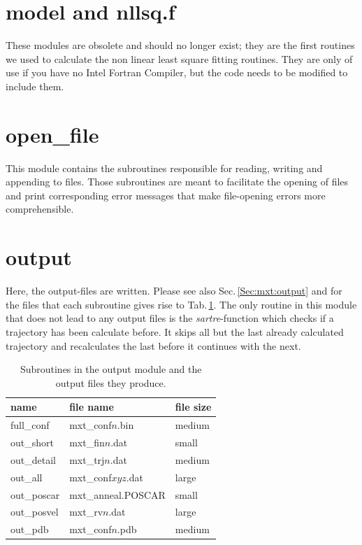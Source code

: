 \documentclass[twoside, 11pt, titlepage, captions=nooneline, a4paper, headsepline]{scrbook}%
\newcommand{\9}{\mathrm}
\newcommand{\0}{\,\mathrm}
\begin{document}
\section{model and nllsq.f}
These modules are obsolete and should no longer exist; they are the first routines we used to calculate the non linear least square fitting routines.
They are only of use if you have no Intel Fortran Compiler, but the code needs to be modified to include them.
\section{open\_file}
This module contains the subroutines responsible for reading, writing and appending to files. Those subroutines are meant to facilitate the opening of files and print corresponding error messages that make file-opening errors more comprehensible.

\section{output}
Here, the output-files are written. Please see also Sec.\,\ref{Sec:mxt:output} and for the files that each subroutine gives rise to Tab.\,\ref{Tab:Funct:output}. The only routine in this module that does not lead to any output files is the \textit{sartre}-function which checks if a trajectory has been calculate before. It skips all but the last already calculated trajectory and recalculates the last before it continues with the next.

\begin{table}[b!]
\centering
\caption{Subroutines in the output module and the output files they produce.}
\label{Tab:Funct:output}
\begin{tabular}{lll}
\hline\hline
name			&file name			& file size\\
\hline
full\_conf		&mxt\_conf$n$.bin	&medium\\
out\_short		&mxt\_fin$n$.dat 	&small\\
out\_detail		&mxt\_trj$n$.dat	&medium\\
out\_all		&mxt\_conf$xyz$.dat	&large\\
out\_poscar		&mxt\_anneal.POSCAR	&small\\
out\_posvel		&mxt\_rv$n$.dat		&large\\
out\_pdb		&mxt\_conf$n$.pdb	&medium\\
\hline
\hline
\end{tabular}
\end{table}
\end{document}
